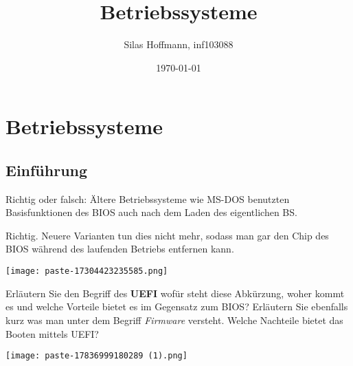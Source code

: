 \documentclass{article}
\title{Betriebssysteme}
\author{Silas Hoffmann, inf103088}
\date{\today}
\begin{document}
\maketitle
\vspace{0.5cm}
\tableofcontents
\clearpage

\section{Betriebssysteme}
\subsection{Einführung}%
\begin{tcolorbox}[colback=white!10!white,colframe=lightgray!75!black,
  savelowerto=\jobname_ex.tex,breakable,enhanced,lines before break=40]

\begin{center}
Richtig oder falsch: Ältere Betriebssysteme wie MS-DOS benutzten Basisfunktionen des BIOS auch nach dem Laden des eigentlichen BS.

\end{center}

\tcblower

\justifying
Richtig. Neuere Varianten tun dies nicht mehr, sodass man gar den Chip des BIOS während des laufenden Betriebs entfernen kann.
\begin{center}
\texttt{[image: paste-17304423235585.png]}
\end{center}

\end{tcolorbox}
\begin{tcolorbox}[colback=white!10!white,colframe=lightgray!75!black,
  savelowerto=\jobname_ex.tex,breakable,enhanced,lines before break=40]

\begin{center}
Erläutern Sie den Begriff des 
\textbf{UEFI
}wofür steht diese Abkürzung, woher kommt es und welche Vorteile bietet es im Gegensatz zum BIOS?
Erläutern Sie ebenfalls kurz was man unter dem Begriff 
\textit{Firmware 
}versteht.
Welche Nachteile bietet das Booten mittels UEFI?

\end{center}

\tcblower

\justifying
\begin{center}
\texttt{[image: paste-17836999180289 (1).png]}
\end{center}

\end{tcolorbox}
\end{document}
